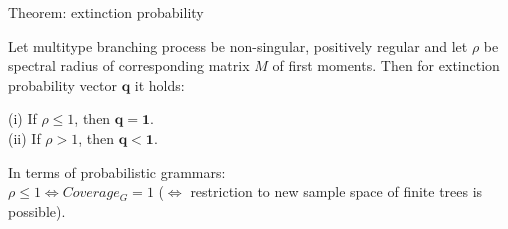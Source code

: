 \documentclass[t,usenames,dvipsnames]{beamer} %
\newcommand{\e}{\boldsymbol{e}}
\newcommand{\q}{\boldsymbol{q}}
\newcommand{\1}{\boldsymbol{1}}
\newcommand{\0}{\boldsymbol{0}}
\newcommand{\N}{\mathbb{N}}
\newcommand{\Z}{\boldsymbol{Z}}
\newcommand{\Zn}{\boldsymbol{Z}_n}
\renewcommand{\r}{\boldsymbol{r}}
\renewcommand{\e}{\boldsymbol{e}}
\begin{document}
\begin{frame}

\begin{block}{Theorem: extinction probability}

    Let multitype branching process be non-singular, positively regular
    and let $\rho$ be spectral radius of corresponding 
    matrix $M$ of first moments.
    Then for extinction probability vector $\q$ it holds:

(i) If \( \rho \le 1 \), then \( \mathbf{q = 1} \). \\
(ii) If \( \rho > 1 \), then \( \mathbf{q < 1} \).
\end{block}

\pause

In terms of probabilistic grammars: \\
    $\rho \le 1 \iff Coverage_G = 1 $
    ($\iff$ restriction to new sample space of finite trees is possible).
\pause


\pause
    \label{Thm}

\end{frame}




\end{document}
